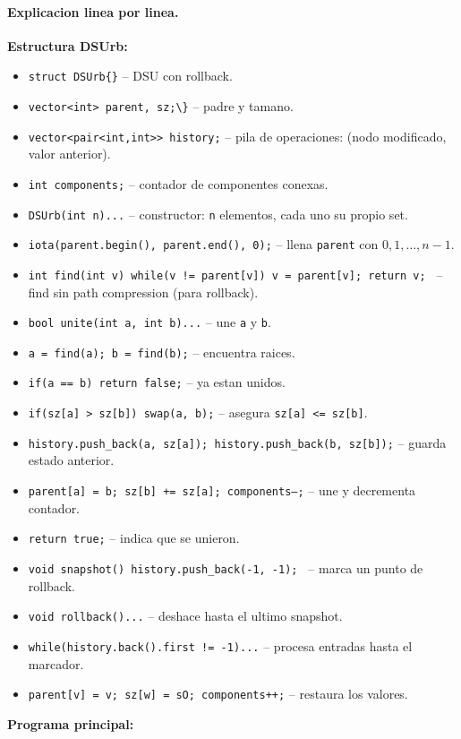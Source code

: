 \paragraph{Explicacion linea por linea.}
\textbf{Estructura DSUrb:}
\begin{itemize}\setlength\itemsep{0pt}
	\item \verb|struct DSUrb{}| -- DSU con rollback.
	\item \verb|vector<int> parent, sz;\}| -- padre y tamano.
	\item \texttt{vector<pair<int,int>> history;} -- pila de operaciones: (nodo modificado, valor anterior).
	\item \texttt{int components;} -- contador de componentes conexas.
	\item \texttt{DSUrb(int n){...}} -- constructor: \texttt{n} elementos, cada uno su propio set.
	\item \texttt{iota(parent.begin(), parent.end(), 0);} -- llena \texttt{parent} con $0, 1, \dots, n-1$.
	\item \texttt{int find(int v){ while(v != parent[v]) v = parent[v]; return v; }} -- find sin path compression (para rollback).
	\item \texttt{bool unite(int a, int b){...}} -- une \texttt{a} y \texttt{b}.
	\item \texttt{a = find(a); b = find(b);} -- encuentra raices.
	\item \texttt{if(a == b) return false;} -- ya estan unidos.
	\item \texttt{if(sz[a] > sz[b]) swap(a, b);} -- asegura \texttt{sz[a] <= sz[b]}.
	\item \texttt{history.push\_back({a, sz[a]}); history.push\_back({b, sz[b]});} -- guarda estado anterior.
	\item \texttt{parent[a] = b; sz[b] += sz[a]; components--;} -- une y decrementa contador.
	\item \texttt{return true;} -- indica que se unieron.
	\item \texttt{void snapshot(){ history.push\_back({-1, -1}); }} -- marca un punto de rollback.
	\item \texttt{void rollback(){...}} -- deshace hasta el ultimo snapshot.
	\item \texttt{while(history.back().first != -1){...}} -- procesa entradas hasta el marcador.
	\item \texttt{parent[v] = v; sz[w] = sO; components++;} -- restaura los valores.
\end{itemize}
\textbf{Programa principal:}
